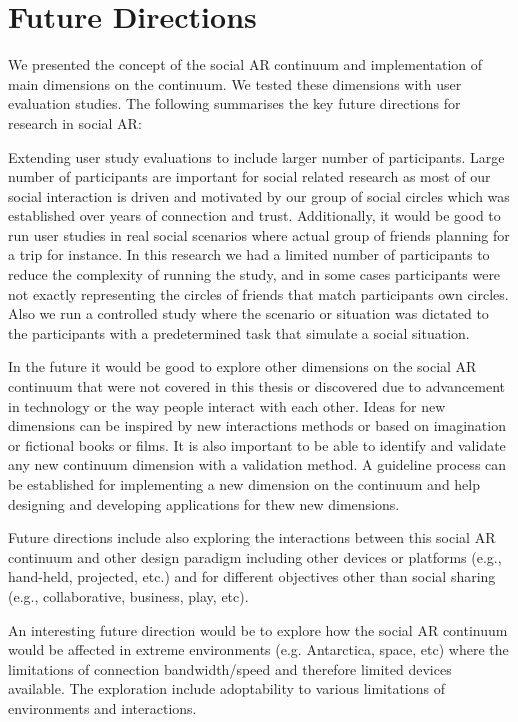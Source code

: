 \pagebreak
\section{Future Directions}

We presented the concept of the social AR continuum and implementation of main dimensions on the continuum. We tested these dimensions with user evaluation studies. The following summarises the key future directions for research in social AR:  

Extending user study evaluations to include larger number of participants. Large number of participants are important for social related research as most of our social interaction is driven and motivated by our group of social circles which was established over years of connection and trust. 
Additionally, it would be good to run user studies in real social scenarios where actual group of friends planning for a trip for instance. 
In this research we had a limited number of participants to reduce the complexity of running the study, and in some cases participants were not exactly representing the circles of friends that match participants own circles. Also we run a controlled study where the scenario or situation was dictated to the participants with a predetermined task that simulate a social situation.

In the future it would be good to explore other dimensions on the social AR continuum that were not covered in this thesis or discovered due to advancement in technology or the way people interact with each other. 
Ideas for new dimensions can be inspired by new interactions methods or based on imagination or fictional books or films. 
It is also important to be able to identify and validate any new continuum dimension with a validation method.
A guideline process can be established for implementing a new dimension on the continuum and help designing and developing applications for thew new dimensions. 

Future directions include also exploring the interactions between this social AR continuum and other design paradigm including other devices or platforms (e.g., hand-held, projected, etc.) and for different objectives other than social sharing (e.g., collaborative, business, play, etc).

An interesting future direction would be to explore how the social AR continuum would be affected in extreme environments (e.g. Antarctica, space, etc) where the limitations of connection bandwidth/speed and therefore limited devices available. The exploration include adoptability to various limitations of environments and interactions. 


